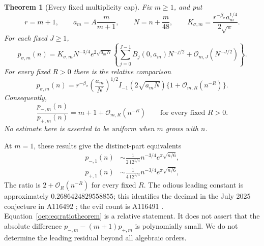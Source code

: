 \documentclass[11pt,letterpaper]{article}
\newtheorem{theorem}{Theorem}[section]
\theoremstyle{remark}\newtheorem{remark}[theorem]{Remark}
\newcommand{\OO}{\mathcal O}
\begin{document}
\begin{theorem}[Every fixed multiplicity cap]\label{oep:thm:capped}
Fix $m\geq1$, and put
\[
 r=m+1,\qquad a_m=A\frac{m}{m+1},\qquad N=n+\frac m{48},
 \qquad K_{\sigma,m}=\frac{r^{-\beta_\sigma}a_m^{1/4}}{2\sqrt\pi}.
\]
For each fixed $J\geq1$,
\begin{equation}\label{oep:eq:capped}
 p_{\sigma,m}(n)=K_{\sigma,m}N^{-3/4}e^{2\sqrt{a_mN}}
 \left\{\sum_{j=0}^{J-1}B_j(0,a_m)N^{-j/2}
              +\OO_{m,J}(N^{-J/2})\right\}.
\end{equation}
For every fixed $R>0$ there is the relative comparison
\begin{equation}\label{oep:eq:cappedflat}
 p_{\sigma,m}(n)=r^{-\beta_\sigma}\left(\frac{a_m}{N}\right)^{1/2}
 I_{-1}(2\sqrt{a_mN})\{1+\OO_{m,R}(n^{-R})\}.
\end{equation}
Consequently,
\begin{equation}\label{oep:eq:ratiotheorem}
 \frac{p_{-,m}(n)}{p_{+,m}(n)}=m+1+\OO_{m,R}(n^{-R})
 \qquad\text{for every fixed }R>0.
\end{equation}
No estimate here is asserted to be uniform when $m$ grows with $n$.
\end{theorem}
At $m=1$, these results give the distinct-part equivalents
\begin{align}
 p_{-,1}(n)&\sim \frac{1}{2\,12^{1/4}}n^{-3/4}e^{\pi\sqrt{n/6}},\label{oep:eq:distinctodious}\\
 p_{+,1}(n)&\sim \frac{1}{4\,12^{1/4}}n^{-3/4}e^{\pi\sqrt{n/6}},\label{oep:eq:distinctevil}
\end{align}
The ratio is $2+\OO_R(n^{-R})$ for every fixed $R$. The odious leading constant is approximately $0.2686424829558855$; this identifies the decimal in the July 2025 conjecture in A116492 \cite{oeis116492}; the evil count is A116491 \cite{oeis116491}. Equation~\eqref{oep:eq:ratiotheorem} is a relative statement. It does not assert that the absolute difference $p_{-,m}-(m+1)p_{+,m}$ is polynomially small. We do not determine the leading residual beyond all algebraic orders.
\end{document}
